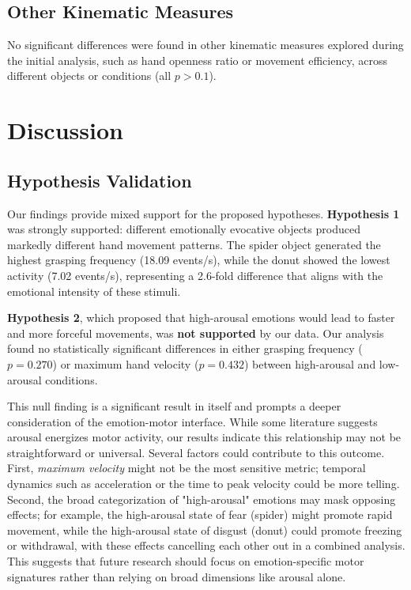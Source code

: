 \documentclass[conference]{IEEEtran}
\begin{document}
\subsection{Other Kinematic Measures}

No significant differences were found in other kinematic measures explored during the initial analysis, such as hand openness ratio or movement efficiency, across different objects or conditions (all $p > 0.1$).

\vfill\null
\columnbreak

\section{Discussion}
\label{sec:discussion}

\subsection{Hypothesis Validation}

Our findings provide mixed support for the proposed hypotheses. 
\textbf{Hypothesis 1} was strongly supported: different emotionally 
evocative objects produced markedly different hand movement patterns. 
The spider object generated the highest grasping frequency (18.09 events/s), 
while the donut showed the lowest activity (7.02 events/s), representing 
a 2.6-fold difference that aligns with the emotional intensity of these stimuli.

\textbf{Hypothesis 2}, which proposed that high-arousal emotions would lead to faster and more forceful movements, was \textbf{not supported} by our data. Our analysis found no statistically significant differences in either grasping frequency ($p=0.270$) or maximum hand velocity ($p=0.432$) between high-arousal and low-arousal conditions.

This null finding is a significant result in itself and prompts a deeper consideration of the emotion-motor interface. While some literature suggests arousal energizes motor activity, our results indicate this relationship may not be straightforward or universal. Several factors could contribute to this outcome. First, \textit{maximum velocity} might not be the most sensitive metric; temporal dynamics such as acceleration or the time to peak velocity could be more telling. Second, the broad categorization of "high-arousal" emotions may mask opposing effects; for example, the high-arousal state of fear (spider) might promote rapid movement, while the high-arousal state of disgust (donut) could promote freezing or withdrawal, with these effects cancelling each other out in a combined analysis. This suggests that future research should focus on emotion-specific motor signatures rather than relying on broad dimensions like arousal alone.
\end{document}
